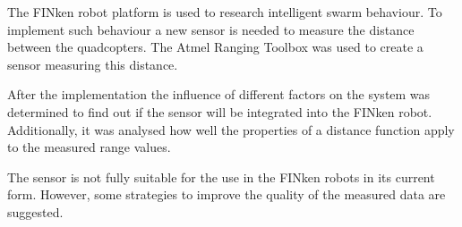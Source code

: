 
The FINken robot platform is used to research intelligent swarm behaviour.
To implement such behaviour a new sensor is needed to measure the distance between the quadcopters.
The Atmel Ranging Toolbox was used to create a sensor measuring this distance.

After the implementation the influence of different factors on the system was determined to find out if the sensor will be integrated into the FINken robot.
Additionally, it was analysed how well the properties of a distance function apply to the measured range values.

The sensor is not fully suitable for the use in the FINken robots in its current form.
However, some strategies to improve the quality of the measured data are suggested.
